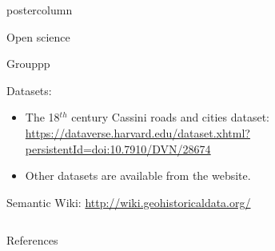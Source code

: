 \documentclass[final,hyperref={pdfpagelabels=false}]{beamer}
\begin{document}
\begin{frame}
\begin{columns}
\begin{column}{0.4\textwidth}
\begin{beamercolorbox}[center,wd=\textwidth]{postercolumn}
\begin{minipage}[t]{.98\textwidth}
\begin{block}{Open science}
\begin{Mdescription}{Grouppp}
            \item[\textcolor{ta3orange}{Datasets:}]
              \begin{itemize}\tiny
              \item The 18$^{th}$ century Cassini roads and cities dataset: \url{https://dataverse.harvard.edu/dataset.xhtml?persistentId=doi:10.7910/DVN/28674}\\
              \item Other datasets are available from the website.
              \end{itemize}
            \item[\textcolor{ta3orange}{Semantic Wiki:}] \url{http://wiki.geohistoricaldata.org/}
            \end{Mdescription}
          \end{block}
        \end{minipage}
      \end{beamercolorbox}
    \end{column}
  \end{columns}
  
  \begin{block}{References}
    \vspace*{-1.5em}
	\begin{multicols}{2}
		\tiny
		
		
	\end{multicols}
  \end{block}
\end{frame}
\end{document}
